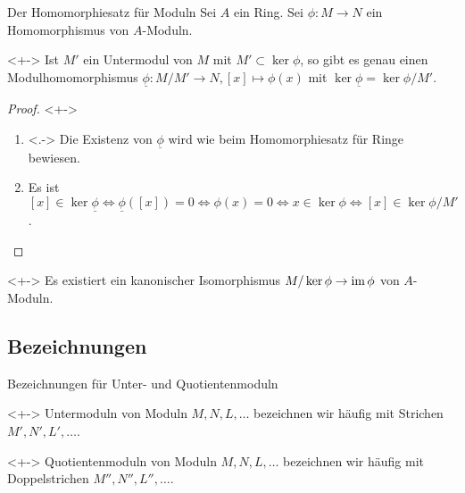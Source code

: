 \begin{frame}{Der Homomorphiesatz für Moduln}
	Sei \(A\) ein Ring. Sei \(\phi\colon M \to N\) ein Homomorphismus von
	\(A\)-Moduln. 
	\begin{proposition}<+->
		Ist \(M'\) ein Untermodul von \(M\)
		mit \(M' \subset \ker \phi\), so gibt es genau
		einen Modulhomomorphismus \(\underline \phi\colon M/M' \to N,
		[x] \mapsto \phi(x)\) mit \(\ker \underline{\phi} = \ker \phi/M'\).
	\end{proposition}
	\begin{proof}<+->
		\begin{enumerate}[<+->]
		\item<.->
			Die Existenz von \(\underline \phi\) wird wie beim Homomorphiesatz für
			Ringe bewiesen.
		\item
			Es ist \([x] \in \ker{\underline\phi} \iff 
			\underline\phi([x]) = 0 \iff
			\phi(x) = 0 \iff
			x \in \ker\phi \iff [x] \in \ker\phi/M'\).
			\qedhere
		\end{enumerate}
	\end{proof}
	\begin{example}<+->
		Es existiert ein kanonischer Isomorphismus \(M/\ker \phi \to \operatorname{im} \phi\) von
		\(A\)-Moduln.
	\end{example}
\end{frame}

\subsection{Bezeichnungen}

\begin{frame}{Bezeichnungen für Unter- und Quotientenmoduln}
	\begin{convention}<+->
		Untermoduln von Moduln \(M, N, L, \dotsc\) bezeichnen wir häufig mit Strichen
		\(M', N', L', \dotsc\).
	\end{convention}
	\begin{convention}<+->
		Quotientenmoduln von Moduln \(M, N, L, \dotsc\) bezeichnen wir häufig mit
		Doppelstrichen \(M'', N'', L'', \dotsc\).
	\end{convention}
\end{frame}

